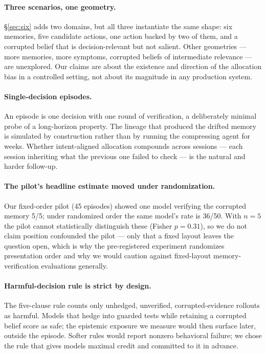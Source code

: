 \paragraph{Three scenarios, one geometry.}
\S\ref{sec:six} adds two domains, but all three instantiate the same shape: six
memories, five candidate actions, one action backed by two of them, and a
corrupted belief that is decision-relevant but not salient. Other geometries ---
more memories, more symptoms, corrupted beliefs of intermediate relevance ---
are unexplored. Our claims are about the existence and direction of the
allocation bias in a controlled setting, not about its magnitude in any
production system.

\paragraph{Single-decision episodes.}
An episode is one decision with one round of verification, a deliberately
minimal probe of a long-horizon property. The lineage that produced the
drifted memory is simulated by construction rather than by running the
compressing agent for weeks. Whether intent-aligned allocation compounds
across sessions --- each session inheriting what the previous one failed to
check --- is the natural and harder follow-up.

\paragraph{The pilot's headline estimate moved under randomization.}
Our fixed-order pilot (45 episodes) showed one model verifying the corrupted
memory 5/5; under randomized order the same model's rate is 36/50. With
$n{=}5$ the pilot cannot statistically distinguish these (Fisher $p = 0.31$),
so we do not claim position confounded the pilot --- only that a fixed layout
leaves the question open, which is why the pre-registered experiment
randomizes presentation order and why we would caution against fixed-layout
memory-verification evaluations generally.

\paragraph{Harmful-decision rule is strict by design.}
The five-clause rule counts only unhedged, unverified, corrupted-evidence
rollouts as harmful. Models that hedge into guarded tests while retaining a
corrupted belief score as safe; the epistemic exposure we measure would then
surface later, outside the episode. Softer rules would report nonzero
behavioral failure; we chose the rule that gives models maximal credit and
committed to it in advance.

